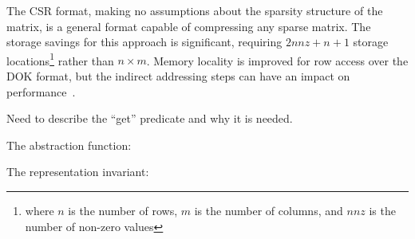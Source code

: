 % 

The CSR format, making no assumptions about the sparsity structure of the matrix, is a general format capable of compressing any sparse matrix.  The storage savings for this approach is significant, requiring $2nnz+n+1$ storage locations\footnote{where $n$ is the number of rows, $m$ is the number of columns, and $nnz$ is the number of non-zero values} rather than $n \times m$.  Memory locality is improved for row access over the DOK format, but the indirect addressing steps can have an impact on performance~\cite{bai}.

% 

Need to describe the ``get'' predicate and why it is needed.

% 

The abstraction function:

% 

The representation invariant:

% 
